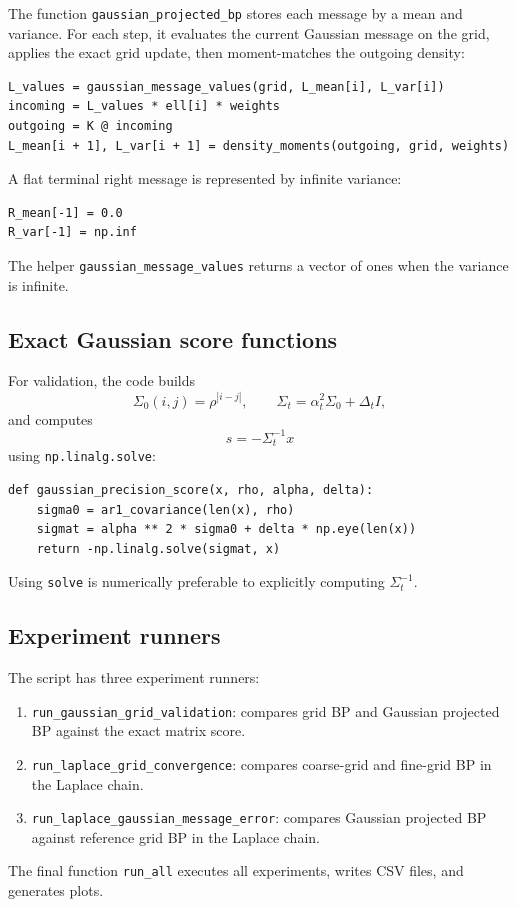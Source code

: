 \documentclass[11pt]{article}
\begin{document}
The function \texttt{gaussian\_projected\_bp} stores each message by a mean and variance. For each step, it evaluates the current Gaussian message on the grid, applies the exact grid update, then moment-matches the outgoing density:
\begin{lstlisting}[style=pythonstyle]
L_values = gaussian_message_values(grid, L_mean[i], L_var[i])
incoming = L_values * ell[i] * weights
outgoing = K @ incoming
L_mean[i + 1], L_var[i + 1] = density_moments(outgoing, grid, weights)
\end{lstlisting}
A flat terminal right message is represented by infinite variance:
\begin{lstlisting}[style=pythonstyle]
R_mean[-1] = 0.0
R_var[-1] = np.inf
\end{lstlisting}
The helper \texttt{gaussian\_message\_values} returns a vector of ones when the variance is infinite.

\subsection{Exact Gaussian score functions}

For validation, the code builds
\begin{equation}
  \Sigma_0(i,j)=\rho^{|i-j|},
  \qquad
  \Sigma_t=\alpha_t^2\Sigma_0+\Delta_t I,
\end{equation}
and computes
\begin{equation}
  s=-\Sigma_t^{-1}x
\end{equation}
using \texttt{np.linalg.solve}:
\begin{lstlisting}[style=pythonstyle]
def gaussian_precision_score(x, rho, alpha, delta):
    sigma0 = ar1_covariance(len(x), rho)
    sigmat = alpha ** 2 * sigma0 + delta * np.eye(len(x))
    return -np.linalg.solve(sigmat, x)
\end{lstlisting}
Using \texttt{solve} is numerically preferable to explicitly computing \(\Sigma_t^{-1}\).

\subsection{Experiment runners}

The script has three experiment runners:
\begin{enumerate}[label=\arabic*.]
  \item \texttt{run\_gaussian\_grid\_validation}: compares grid BP and Gaussian projected BP against the exact matrix score.
  \item \texttt{run\_laplace\_grid\_convergence}: compares coarse-grid and fine-grid BP in the Laplace chain.
  \item \texttt{run\_laplace\_gaussian\_message\_error}: compares Gaussian projected BP against reference grid BP in the Laplace chain.
\end{enumerate}
The final function \texttt{run\_all} executes all experiments, writes CSV files, and generates plots.
\end{document}
